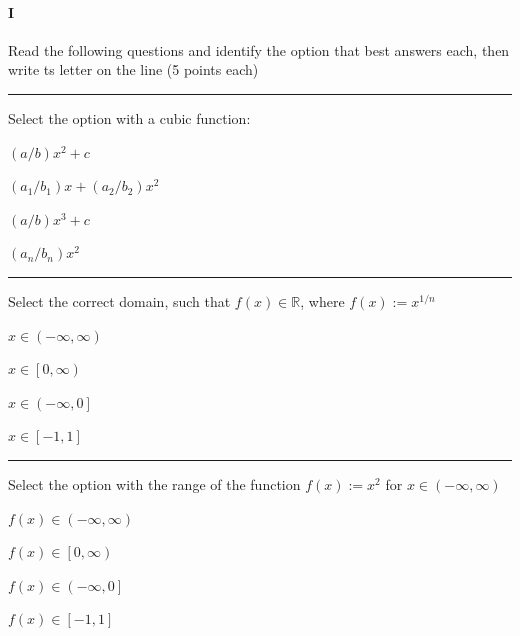 
\paragraph{I} Read the following questions and identify the option that best answers each, then write ts letter on the line (5 points each)

\begin{preguntas}

\pregunta[5] \rule{1cm}{0.1mm} Select the option with a cubic function:

\begin{enumerate*}[label=(\alph*)]
    \item $(a/b)x^2 + c\qquad$
    \item $(a_1/b_1)x + (a_2/b_2)x^2\qquad$
    \item $(a/b)x^3 + c\qquad$
    \item $(a_n/b_n)x^2\qquad$
\end{enumerate*}

\pregunta[5] \rule{1cm}{0.1mm} Select the correct domain, such that $f(x)\in\mathbb{R}$, where $f(x):=x^{1/n}$

\begin{enumerate*}[label=(\alph*)]
    \item $x\in\left(-\infty,\infty\right)\qquad$
    \item $x\in\left[0,\infty\right)\qquad$
    \item $x\in\left(-\infty,0\right]\qquad$
    \item $x\in\left[-1,1\right]\qquad$
\end{enumerate*}

\pregunta[5] \rule{1cm}{0.1mm} Select the option with the range of the function $f(x):=x^2$ for $x\in\left(-\infty,\infty\right)$

\begin{enumerate*}[label=(\alph*)]
    \item $f(x)\in\left(-\infty,\infty\right)\qquad$
    \item $f(x)\in\left[0,\infty\right)\qquad$
    \item $f(x)\in\left(-\infty,0\right]\qquad$
    \item $f(x)\in\left[-1,1\right]\qquad$
\end{enumerate*}


\end{preguntas}
